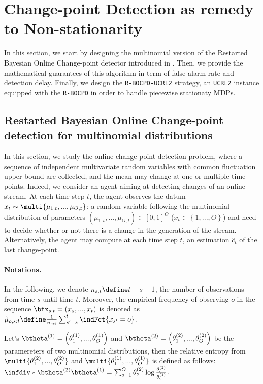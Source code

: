 \documentclass{article} %
\begin{document}
\section{Change-point Detection as remedy to Non-stationarity}

In this section, we start by designing the multinomial version of the Restarted Bayesian Online Change-point detector introduced in \cite{alami20a}. Then, we provide the mathematical guarantees of this algorithm in term of false alarm rate and detection delay. Finally, we design the \texttt{R-BOCPD-UCRL2} strategy, an \texttt{UCRL2} instance equipped with the \texttt{R-BOCPD} in order to handle piecewise stationaty MDPs. 

\subsection{Restarted Bayesian Online Change-point detection for multinomial distributions} 

In this section, we study the online change point detection problem, where a sequence of
independent multivariate random variables with common fluctuation upper bound are
collected, and the mean may change at one or multiple time points. Indeed, we consider an agent aiming at detecting changes  of an online stream.
At each time step $t$, the agent observes the datum $x_t \sim \multi{\mu_{1,t},..., \mu_{O,t}}$: a random variable following the multinomial distribution of parameters $\left(\mu_{1,t},..., \mu_{O,t}\right) \in \left[0,1 \right]^O$ ($x_t \in \left\lbrace 1,..., O \right\rbrace  $) and need to decide whether or not there is a change in the generation of the stream. Alternatively,  the agent may compute at each time step $t$, an estimation  $\hat{c}_t$ of the last change-point.

\paragraph{Notations.}
In the following, we denote $n_{s:t} \define t-s+1$, the number of observations from time $s$ until time $t$. Moreover,  the empirical frequency of observing $o$ in the sequence $\bfx_{s:t} = \left(x_s,...,x_t \right)$ is denoted as $\hat{\mu}_{o,s:t} \define \frac{1}{n_{s:t}} \sum_{s'=s}^t \indFct{x_{s'}= o}$.


\begin{definition}
Let's $\btheta^{(1)}  = \left(\theta^{(1)}_1,..., \theta^{(1)}_O \right)$ and 
$\btheta^{(2)}  = \left(\theta^{(2)}_1,..., \theta^{(2)}_O \right)$
be the paramereters of two multinomial distributions, then the relative entropy from $\multi{\theta^{(2)}_1,..., \theta^{(2)}_O}$ and $\multi{\theta^{(1)}_1,..., \theta^{(1)}_O}$ is defined as follows: $\infdiv*{\btheta^{(2)}}{\btheta^{(1)}} = \sum_{o=1}^{O} \theta^{(2)}_o  \log \frac{\theta^{(2)}_o}{\theta^{(1)}_o}$.
\end{definition}
\end{document}
